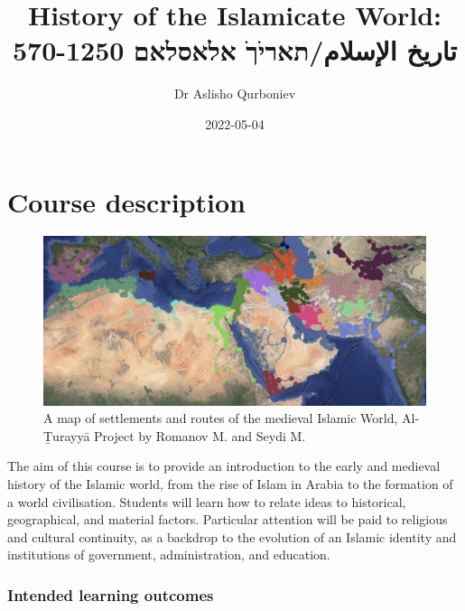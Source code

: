 \documentclass[
]{book}
\title{History of the Islamicate World: 570-1250 تاريخ الإسلام/תאריֹךֹ אלאסלאם}
\author{Dr Aslisho Qurboniev}
\date{2022-05-04}
\begin{document}
\maketitle

{
\setcounter{tocdepth}{1}
\tableofcontents
}
\hypertarget{course-description}{%
\chapter*{Course description}\label{course-description}}

\begin{figure}
\centering
\includegraphics{./files/map.png}
\caption{A map of settlements and routes of the medieval Islamic World, Al-Ṯurayyā Project by Romanov M. and Seydi M.}
\end{figure}

The aim of this course is to provide an introduction to the early and medieval history of the Islamic world, from the rise of Islam in Arabia to the formation of a world civilisation. Students will learn how to relate ideas to historical, geographical, and material factors. Particular attention will be paid to religious and cultural continuity, as a backdrop to the evolution of an Islamic identity and institutions of government, administration, and education.

\hypertarget{intended-learning-outcomes}{%
\subsection*{Intended learning outcomes}\label{intended-learning-outcomes}}
\end{document}
